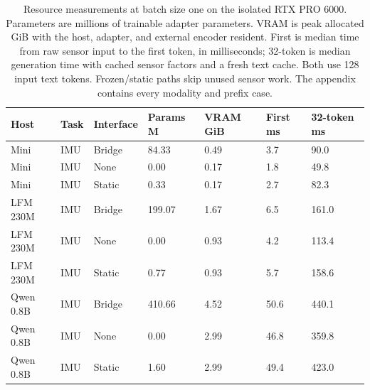 \begin{table}[!htbp]\centering\small
\setlength{\tabcolsep}{4pt}
\caption{Resource measurements at batch size one on the isolated RTX PRO 6000. Parameters are millions of trainable adapter parameters. VRAM is peak allocated GiB with the host, adapter, and external encoder resident. First is median time from raw sensor input to the first token, in milliseconds; 32-token is median generation time with cached sensor factors and a fresh text cache. Both use 128 input text tokens. Frozen/static paths skip unused sensor work. The appendix contains every modality and prefix case.}\label{tab:resources}
\begin{tabular}{@{}lllllll@{}}
\toprule
Host & Task & Interface & Params M & VRAM GiB & First ms & 32-token ms \\
\midrule
Mini & IMU & Bridge & 84.33 & 0.49 & 3.7 & 90.0 \\
Mini & IMU & None & 0.00 & 0.17 & 1.8 & 49.8 \\
Mini & IMU & Static & 0.33 & 0.17 & 2.7 & 82.3 \\
LFM 230M & IMU & Bridge & 199.07 & 1.67 & 6.5 & 161.0 \\
LFM 230M & IMU & None & 0.00 & 0.93 & 4.2 & 113.4 \\
LFM 230M & IMU & Static & 0.77 & 0.93 & 5.7 & 158.6 \\
Qwen 0.8B & IMU & Bridge & 410.66 & 4.52 & 50.6 & 440.1 \\
Qwen 0.8B & IMU & None & 0.00 & 2.99 & 46.8 & 359.8 \\
Qwen 0.8B & IMU & Static & 1.60 & 2.99 & 49.4 & 423.0 \\
\bottomrule
\end{tabular}
\end{table}\par
